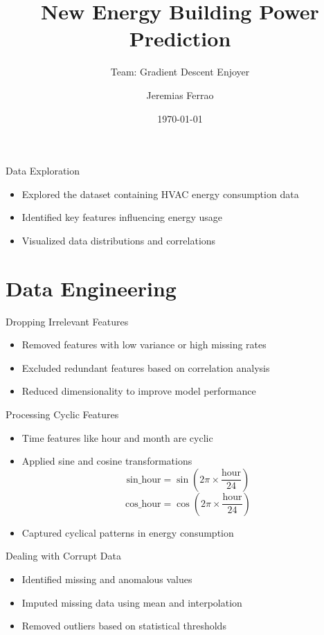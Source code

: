 \documentclass{beamer}
\title{New Energy Building Power Prediction}
\subtitle{Team: Gradient Descent Enjoyer}
\author{Jeremias Ferrao}
\date{\today}
\begin{document}
\begin{frame}
  \titlepage
\end{frame}

\begin{frame}{Data Exploration}
  \begin{itemize}
    \item Explored the dataset containing HVAC energy consumption data
    \item Identified key features influencing energy usage
    \item Visualized data distributions and correlations
  \end{itemize}
  
\end{frame}

\section{Data Engineering}

\begin{frame}{Dropping Irrelevant Features}
  \begin{itemize}
    \item Removed features with low variance or high missing rates
    \item Excluded redundant features based on correlation analysis
    \item Reduced dimensionality to improve model performance
  \end{itemize}
\end{frame}

\begin{frame}{Processing Cyclic Features}
  \begin{itemize}
    \item Time features like hour and month are cyclic
    \item Applied sine and cosine transformations
    \[
    \text{sin\_hour} = \sin\left(2\pi \times \frac{\text{hour}}{24}\right)
    \]
    \[
    \text{cos\_hour} = \cos\left(2\pi \times \frac{\text{hour}}{24}\right)
    \]
    \item Captured cyclical patterns in energy consumption
  \end{itemize}
\end{frame}

\begin{frame}{Dealing with Corrupt Data}
  \begin{itemize}
    \item Identified missing and anomalous values
    \item Imputed missing data using mean and interpolation
    \item Removed outliers based on statistical thresholds
  \end{itemize}
\end{frame}
\end{document}
